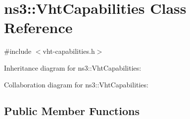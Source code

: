 \hypertarget{classns3_1_1VhtCapabilities}{}\section{ns3\+:\+:Vht\+Capabilities Class Reference}
\label{classns3_1_1VhtCapabilities}


{\ttfamily \#include $<$vht-\/capabilities.\+h$>$}



Inheritance diagram for ns3\+:\+:Vht\+Capabilities\+:


Collaboration diagram for ns3\+:\+:Vht\+Capabilities\+:
\subsection*{Public Member Functions}
